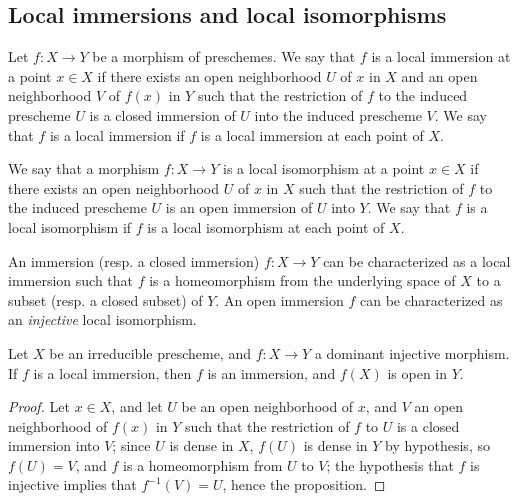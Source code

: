 \subsection{Local immersions and local isomorphisms}
\label{subsection:I.4.5}

\begin{definition}[4.5.1]
\label{I.4.5.1}
Let $f:X\to Y$ be a morphism of preschemes.
We say that $f$ is a local immersion at a point $x\in X$ if there exists an open neighborhood $U$ of $x$ in $X$ and an open neighborhood $V$ of $f(x)$ in $Y$ such that the restriction of $f$ to the induced prescheme $U$ is a closed immersion of $U$ into the induced prescheme $V$.
We say that $f$ is a local immersion if $f$ is a local immersion at each point of $X$.
\end{definition}

\begin{definition}[4.5.2]
\label{I.4.5.2}
We say that a morphism $f:X\to Y$ is a local isomorphism at
a point $x\in X$ if there exists an open neighborhood $U$ of $x$ in $X$ such that the restriction of $f$ to the induced prescheme $U$ is an open immersion of $U$ into $Y$.
We say that $f$ is a local isomorphism if $f$ is a local isomorphism at each point of $X$.
\end{definition}

\begin{env}[4.5.3]
\label{I.4.5.3}
An immersion (resp. a closed immersion) $f:X\to Y$ can be characterized as a local immersion such that $f$ is a homeomorphism from the underlying space of $X$ to a subset (resp. a closed subset) of $Y$.
An open immersion $f$ can be characterized as an \emph{injective} local isomorphism.
\end{env}

\begin{proposition}[4.5.4]
\label{I.4.5.4}
Let $X$ be an irreducible prescheme, and $f:X\to Y$ a dominant injective morphism.
If $f$ is a local immersion, then $f$ is an immersion, and $f(X)$ is open in $Y$.
\end{proposition}

\begin{proof}
\label{proof-I.4.5.4}
Let $x\in X$, and let $U$ be an open neighborhood of $x$, and $V$ an open neighborhood of $f(x)$ in $Y$ such that the restriction of $f$ to $U$ is a closed immersion into $V$;
since $U$ is dense in $X$, $f(U)$ is dense in $Y$ by hypothesis, so $f(U)=V$, and $f$ is a homeomorphism from $U$ to $V$;
the hypothesis that $f$ is injective implies that $f^{-1}(V)=U$, hence the proposition.
\end{proof}

